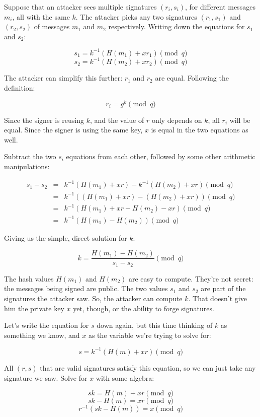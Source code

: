 \documentclass[11pt,ebook,table,dvipsnames]{memoir}
\begin{document}
Suppose that an attacker sees multiple signatures $(r_i, s_i)$, for
different messages $m_i$, all with the same $k$. The attacker picks
any two signatures $(r_1, s_1)$ and $(r_2, s_2)$ of messages $m_1$ and
$m_2$ respectively. Writing down the equations for $s_1$ and $s_2$:

\[
s_1 = k^{-1} (H(m_1) + xr_1) \pmod q
\]
\[
s_2 = k^{-1} (H(m_2) + xr_2) \pmod q
\]

The attacker can simplify this further: $r_1$ and $r_2$ are equal.
Following the definition:

\[
r_i = g^k \pmod q
\]

Since the signer is reusing $k$, and the value of $r$ only depends on
$k$, all $r_i$ will be equal. Since the signer is using the same key,
$x$ is equal in the two equations as well.

Subtract the two $s_i$ equations from each other, followed by some
other arithmetic manipulations:

\begin{eqnarray*}
s_1 - s_2 & = & k^{-1} (H(m_1) + xr) - k^{-1} (H(m_2) + xr) \pmod q \\
& = & k^{-1} \left( (H(m_1) + xr) - (H(m_2) + xr) \right) \pmod q \\
& = & k^{-1} (H(m_1) + xr - H(m_2) - xr) \pmod q \\
& = & k^{-1} (H(m_1) - H(m_2)) \pmod q
\end{eqnarray*}

Giving us the simple, direct solution for $k$:

\[
k = \frac{H(m_1) - H(m_2)}{s_1 - s_2} \pmod q
\]

The hash values $H(m_1)$ and $H(m_2)$ are easy to compute. They're not
secret: the messages being signed are public. The two values $s_1$ and
$s_2$ are part of the signatures the attacker saw. So, the attacker
can compute $k$. That doesn't give him the private key $x$ yet,
though, or the ability to forge signatures.

Let's write the equation for $s$ down again, but this time thinking of
$k$ as something we know, and $x$ as the variable we're trying to
solve for:

\[
s = k^{-1} (H(m) + xr) \pmod q
\]

All $(r, s)$ that are valid signatures satisfy this equation, so we
can just take any signature we saw. Solve for $x$ with some algebra:

\[
sk = H(m) + xr \pmod q
\]
\[
sk - H(m) = xr \pmod q
\]
\[
r^{-1}(sk - H(m)) = x \pmod q
\]
\end{document}
